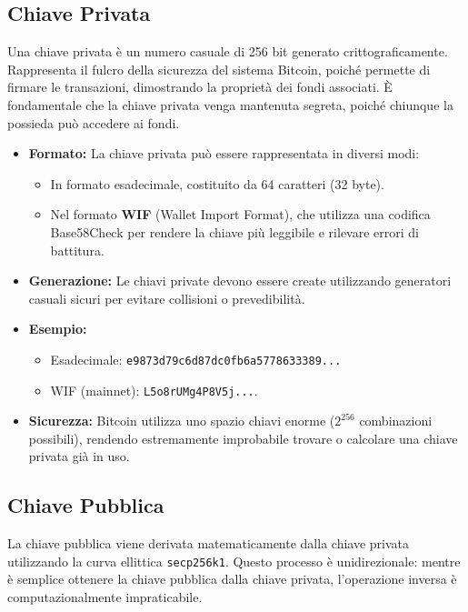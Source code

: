 \documentclass{article}
\begin{document}
\subsection{Chiave Privata}
Una chiave privata è un numero casuale di 256 bit generato crittograficamente. Rappresenta il fulcro della sicurezza del sistema Bitcoin, poiché permette di firmare le transazioni, dimostrando la proprietà dei fondi associati. \`E fondamentale che la chiave privata venga mantenuta segreta, poiché chiunque la possieda può accedere ai fondi.

\begin{itemize}
    \item \textbf{Formato:} La chiave privata può essere rappresentata in diversi modi:
    \begin{itemize}
        \item In formato esadecimale, costituito da 64 caratteri (32 byte).
        \item Nel formato \textbf{WIF} (Wallet Import Format), che utilizza una codifica Base58Check per rendere la chiave più leggibile e rilevare errori di battitura.
    \end{itemize}
    \item \textbf{Generazione:} Le chiavi private devono essere create utilizzando generatori casuali sicuri per evitare collisioni o prevedibilità.
    \item \textbf{Esempio:}
    \begin{itemize}
        \item Esadecimale: \texttt{e9873d79c6d87dc0fb6a5778633389...}
        \item WIF (mainnet): \texttt{L5o8rUMg4P8V5j...}.
    \end{itemize}
    \item \textbf{Sicurezza:} Bitcoin utilizza uno spazio chiavi enorme ($2^{256}$ combinazioni possibili), rendendo estremamente improbabile trovare o calcolare una chiave privata già in uso.
\end{itemize}

\subsection{Chiave Pubblica}
La chiave pubblica viene derivata matematicamente dalla chiave privata utilizzando la curva ellittica \texttt{secp256k1}. Questo processo è unidirezionale: mentre è semplice ottenere la chiave pubblica dalla chiave privata, l'operazione inversa è computazionalmente impraticabile.
\end{document}
